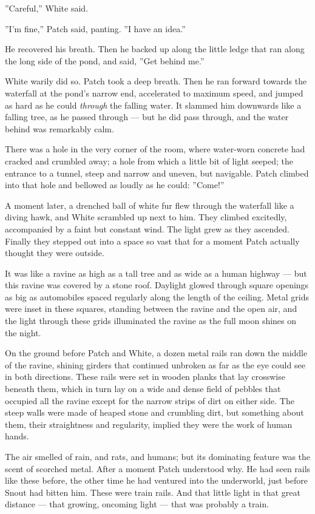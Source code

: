 \documentclass[12pt]{book}
\begin{document}
''Careful,'' White said.

''I'm fine,'' Patch said, panting. ''I have an idea.''

He recovered his breath. Then he backed up along the little ledge that ran along the long side of the pond, and said, ''Get behind me.''

White warily did so. Patch took a deep breath. Then he ran forward towards the waterfall at the pond's narrow end, accelerated to maximum speed, and jumped as hard as he could {\it through }the falling water. It slammed him downwards like a falling tree, as he passed through ---
but he did pass through, and the water behind was remarkably calm.

There was a hole in the very corner of the room, where water-worn concrete had cracked and crumbled away; a hole from which a little bit of light seeped; the entrance to a tunnel, steep and narrow and uneven, but navigable. Patch climbed into that hole and bellowed as loudly as he could: ''Come!''

A moment later, a drenched ball of white fur flew through the waterfall like a diving hawk, and White scrambled up next to him. They climbed excitedly, accompanied by a faint but constant wind. The light grew as they ascended. Finally they stepped out into a space so vast that for a moment Patch actually thought they were outside.

It was like a ravine as high as a tall tree and as wide as a human highway ---
but this ravine was covered by a stone roof. Daylight glowed through square openings as big as automobiles spaced regularly along the length of the ceiling. Metal grids were inset in these squares, standing between the ravine and the open air, and the light through these grids illuminated the ravine as the full moon shines on the night.

On the ground before Patch and White, a dozen metal rails ran down the middle of the ravine, shining girders that continued unbroken as far as the eye could see in both directions. These rails were set in wooden planks that lay crosswise beneath them, which in turn lay on a wide and dense field of pebbles that occupied all the ravine except for the narrow strips of dirt on either side. The steep walls were made of heaped stone and crumbling dirt, but something about them, their straightness and regularity, implied they were the work of human hands.

The air smelled of rain, and rats, and humans; but its dominating feature was the scent of scorched metal. After a moment Patch understood why. He had seen rails like these before, the other time he had ventured into the underworld, just before Snout had bitten him. These were train rails. And that little light in that great distance ---
that growing, oncoming light ---
that was probably a train.
\end{document}
